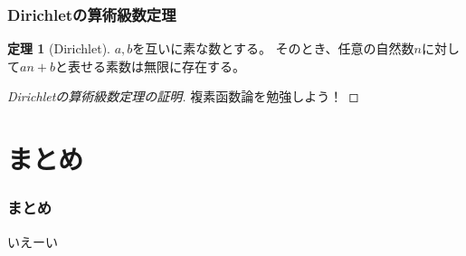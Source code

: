 \documentclass[dvipdfmx,11pt,notheorems]{beamer}
\theoremstyle{definition}
\newtheorem{theorem}{定理}
\begin{document}
\begin{frame}\frametitle{Dirichletの算術級数定理}

\begin{theorem}[Dirichlet]
$a,b$を互いに素な数とする。
そのとき、任意の自然数$n$に対して$an + b$と表せる素数は無限に存在する。
\end{theorem}

\begin{proof}[Dirichletの算術級数定理の証明]
複素函数論を勉強しよう！
\end{proof}

\end{frame}

\section{まとめ}

\begin{frame}\frametitle{まとめ}
いえーい
\end{frame}
\end{document}
